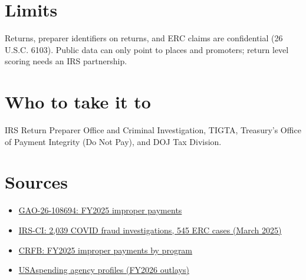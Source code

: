 \documentclass[letterpaper,11pt]{article}
\providecommand{\tightlist}{\setlength{\itemsep}{0pt}\setlength{\parskip}{0pt}}
\begin{document}
\hypertarget{limits}{%
\section{Limits}\label{limits}}

Returns, preparer identifiers on returns, and ERC claims are
confidential (26 U.S.C. 6103). Public data can only point to places and
promoters; return level scoring needs an IRS partnership.

\hypertarget{who-to-take-it-to}{%
\section{Who to take it to}\label{who-to-take-it-to}}

IRS Return Preparer Office and Criminal Investigation, TIGTA, Treasury's
Office of Payment Integrity (Do Not Pay), and DOJ Tax Division.

\hypertarget{sources}{%
\section{Sources}\label{sources}}

\begin{itemize}
\tightlist
\item
  \href{https://www.gao.gov/products/gao-26-108694}{GAO-26-108694:
  FY2025 improper payments}
\item
  \href{https://irs.gov/compliance/criminal-investigation/five-years-post-cares-act-irs-ci-has-launched-2039-covid-fraud-investigations-totaling-10b-in-attempted-fraud}{IRS-CI:
  2,039 COVID fraud investigations, 545 ERC cases (March 2025)}
\item
  \href{https://www.crfb.org/blogs/federal-improper-payments-total-186-billion-fy-2025}{CRFB:
  FY2025 improper payments by program}
\item
  \href{https://www.usaspending.gov/agency}{USAspending agency profiles
  (FY2026 outlays)}
\end{itemize}
\end{document}
